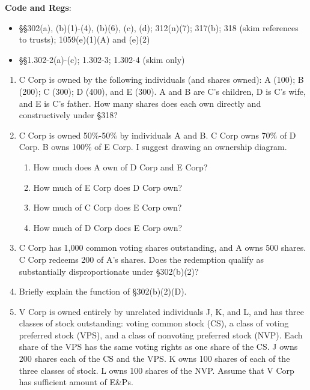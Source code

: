 \documentclass[12pt]{article}
\begin{document}
	\textbf{Code and Regs}: 
		\begin{itemize}
				\item
					\S\S 302(a), (b)(1)-(4), (b)(6), (c), (d); 312(n)(7); 317(b); 318 (skim references to trusts); 1059(e)(1)(A) and (e)(2)
				\item
					\S\S  1.302-2(a)-(c); 1.302-3; 1.302-4 (skim only)
					\\
		\end{itemize}

	

\begin{enumerate}


	\item 
		C Corp is owned by the following individuals (and shares owned): A (100); B (200); C (300); D (400), and E (300).  A and B are C's children, D is C's wife, and E is C's father.  How many shares does each own directly and constructively under \S 318? 
	
	\item 
		C Corp is owned 50\%-50\% by individuals A and B.  C Corp owns 70\% of D Corp.  B owns 100\% of E Corp.  I suggest drawing an ownership diagram.
		\begin{enumerate}
			\item How much does A own of D Corp and E Corp?
			\item How much of E Corp does D Corp own?
			\item How much of C Corp does E Corp own? 
			\item How much of D Corp does E Corp own?
		\end{enumerate}

	\item 
		C Corp has 1,000 common voting shares outstanding, and A owns 500 shares.  C Corp redeems 200 of A's shares.  Does the redemption qualify as substantially disproportionate under \S302(b)(2)?   
		
	\item
		Briefly explain the function of \S302(b)(2)(D).
	
	\item	
	
	V Corp is owned entirely by unrelated individuals J, K, and L, and has three classes of stock outstanding: voting common stock (CS), a class of voting preferred stock (VPS), and a class of nonvoting preferred stock (NVP). Each share of the VPS has the same voting rights as one share of the CS. J owns 200 shares each of the CS and the VPS. K owns 100 shares of each of the three classes of stock. L owns 100 shares of the NVP. Assume that V Corp has sufficient amount of E\&Ps.
		

\end{enumerate}
\end{document}
